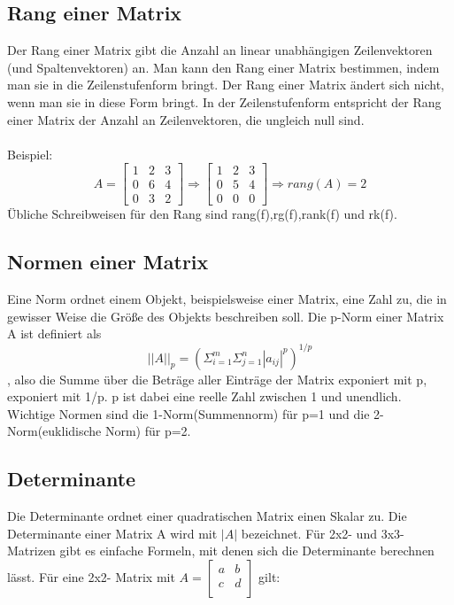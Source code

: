 \documentclass[11pt]{scrreprt}
\begin{document}
\subsection{Rang einer Matrix}
Der Rang einer Matrix gibt die Anzahl an linear unabhängigen Zeilenvektoren (und Spaltenvektoren) an. Man kann den Rang einer Matrix bestimmen, indem man sie in die Zeilenstufenform bringt. Der Rang einer Matrix ändert sich nicht, wenn man sie in diese Form bringt. In der Zeilenstufenform entspricht der Rang einer Matrix der Anzahl an Zeilenvektoren, die ungleich null sind.\\
\\
Beispiel:
\begin{equation}
A = \begin{bmatrix}
1 & 2 & 3\\
0 & 6 & 4\\
0 & 3 & 2
\end{bmatrix}
\Rightarrow
\begin{bmatrix}
1 & 2 & 3\\
0 & 5 & 4\\
0 & 0 & 0
\end{bmatrix}
\Rightarrow rang(A) = 2
\end{equation}
Übliche Schreibweisen für den Rang sind rang(f),rg(f),rank(f) und rk(f).
\subsection{Normen einer Matrix}
Eine Norm ordnet einem Objekt, beispielsweise einer Matrix, eine Zahl zu, die in gewisser Weise die Größe des Objekts beschreiben soll.
Die p-Norm einer Matrix A ist definiert als
\begin{equation}
||A||_p = (\Sigma_{i=1}^m \Sigma_{j=1}^n |a_{ij}|^p)^{1/p}
\end{equation}
, also die Summe über die Beträge aller Einträge der Matrix exponiert mit p,  exponiert mit 1/p. p ist dabei eine reelle Zahl zwischen 1 und unendlich. Wichtige Normen sind die 1-Norm(Summennorm) für p=1 und die 2-Norm(euklidische Norm) für p=2.
\subsection{Determinante}
Die Determinante ordnet einer quadratischen Matrix einen Skalar zu. Die Determinante einer Matrix A wird mit $|A|$ bezeichnet.
Für 2x2- und 3x3- Matrizen gibt es einfache Formeln, mit denen sich die Determinante berechnen lässt. Für eine 2x2- Matrix mit $
A =
\begin{bmatrix}
a & b \\
c & d \\
\end{bmatrix}
$ gilt:
\end{document}
